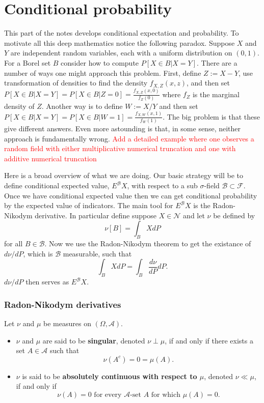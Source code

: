 

\part{Conditional probability}


This part of the notes develops conditional expectation and probability. To motivate all this deep mathematics notice the following paradox. Suppose $X$ and $Y$ are independent random variables, each with a uniform distribution on $(0,1)$. For a Borel set $B$ consider how to compute $P[X\in B| X=Y]$. There are a number of ways one might approach this problem. First, define $Z := X-Y$,  use transformation of densities to find the density $f_{X, Z}(x,z)$, and then set $P[X\in B| X=Y]=P[X\in B| Z=0]=\frac{f_{X,Z}(x,0)}{f_Z(0)}$ where $f_Z$ is the marginal density of $Z$. Another way is to define $W := X/Y$ and then set $P[X\in B| X=Y]=P[X\in B| W=1]=\frac{f_{X,W}(x,1)}{f_W(1)}$. The big problem is that these give different answers. Even more astounding is that, in some sense, neither approach is fundamentally wrong.
\textcolor{red}{Add a detailed example where one observes a random field with either multiplicative numerical truncation and one with additive numerical truncation}


Here is a broad overview of what we are doing. Our basic strategy will be to define conditional expected value, $E^{\mathcal B}X$, with respect to a sub $\sigma$-field $\mathcal B \subset \mathcal F$. Once we have conditional expected value then we can get conditional probability by the expected value of indicators. The main tool for $E^{\mathcal B} X$ is the Radon-Nikodym derivative. In particular define suppose $X\in \mathscr N$ and let $\nu$ be defined by
\[ \nu[B] = \int_B X dP \]
for all $B\in \mathcal B$. Now we use the Radon-Nikodym theorem to get the existance of $d\nu/ dP$, which is $\mathcal B$ measurable, such that
\[ \int_B X dP = \int_B \frac{d\nu}{dP} dP. \]
$d\nu/ dP$ then serves as $E^{\mathcal B}X$.



%
%
\section{Radon-Nikodym derivatives}





\begin{definition}
Let $\nu$ and $\mu$ be measures on $(\Omega, \mathcal A)$.
\begin{itemize}
\item
$\nu$ and $\mu$ are said to be {\bf singular}, denoted $\nu \perp \mu$, if and only if there exists a set $A\in\mathcal A$ such that
\[
\nu(A^c) =0 = \mu(A).
\]
\item
$\nu$ is said to be {\bf absolutely continuous with respect to $\mu$}, denoted $\nu \ll \mu$, if and only if
\[\text{$\nu(A)=0$ for every $\mathcal A$-set $A$ for which $\mu(A)=0$.}  \]
\end{itemize}
\end{definition}

